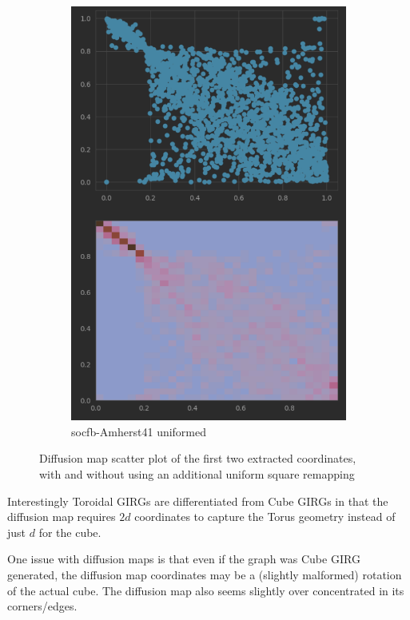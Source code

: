 \begin{figure}
\begin{subfigure}{0.45\textwidth}
      \includegraphics[width=\linewidth]{figures/real_diffmap_plot_uniformed.png}
      \caption{socfb-Amherst41 uniformed}
      \label{fig:sub4}
    \end{subfigure}
  
    \caption{Diffusion map scatter plot of the first two extracted coordinates, with and without using an additional uniform square remapping}
    \label{fig:diffmap_uniformed_vs_nonuniformed}
\end{figure}



Interestingly Toroidal GIRGs are differentiated from Cube GIRGs in that the diffusion map requires $2d$ coordinates to capture the Torus geometry instead of just $d$ for the cube.


One issue with diffusion maps is that even if the graph was Cube GIRG generated, the diffusion map coordinates may be a (slightly malformed) rotation of the actual cube. The diffusion map also seems slightly over concentrated in its corners/edges. 
